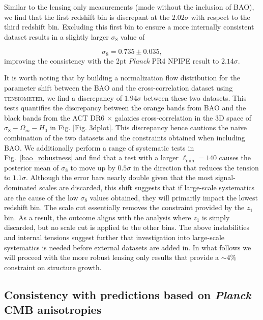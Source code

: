 \documentclass[twocolumn]{aastex631}
\begin{document}
{Similar to the lensing only measurements (made without the inclusion of BAO), we find that the first redshift bin is discrepant at the $2.02\sigma$ with respect to the third redshift bin. Excluding this first bin to ensure a more internally consistent dataset results in a slightly larger $\sigma_8$ value of 

\begin{equation}
    \sigma_8=0.735\pm0.035 ,
\end{equation} improving the consistency with the 2pt \textit{Planck} PR4 NPIPE result to $2.14\sigma$.


It is worth noting that by building a normalization flow distribution for the 
parameter shift between the BAO and the cross-correlation dataset using \textsc{tensiometer}\citep{PhysRevD.104.043504}, we find a discrepancy of $1.94\sigma$ between these two datasets. This tests quantifies the discrepancy between the orange bands from BAO and the black bands from the ACT DR6 $\times$ galaxies cross-correlation in the 3D space of $\sigma_8-\Omega_m-H_0$  in Fig. \ref{Fig. 3dplot}. This discrepancy hence cautions the naive combination of the two datasets and the constraints obtained when including BAO. We additionally perform a range of systematic tests in Fig.~\ref{bao_robustness} and find that a test with a larger $\ell_\mathrm{min}=140$ causes the posterior mean of $\sigma_8$ to move up by $0.5\sigma$ in the direction that reduces the tension to $1.1\sigma$. Although the error bars nearly double given that the most signal-dominated scales are discarded, this shift suggests that if large-scale systematics are the cause of the low $\sigma_8$ values obtained, they will primarily impact the lowest redshift bin. The scale cut essentially removes the constraint provided by the $z_1$ bin. As a result, the outcome aligns with the analysis where $z_1$ is simply discarded, but no scale cut is applied to the other bins. The above instabilities and internal tensions suggest further that investigation into large-scale systematics is needed before external datasets are added in. In what follows we will proceed with the more robust lensing only results that provide a $\sim4\%$ constraint on structure growth.







\subsection{Consistency with predictions based on \textit{Planck} CMB anisotropies}\label{sec.lcdm}

}
\end{document}
